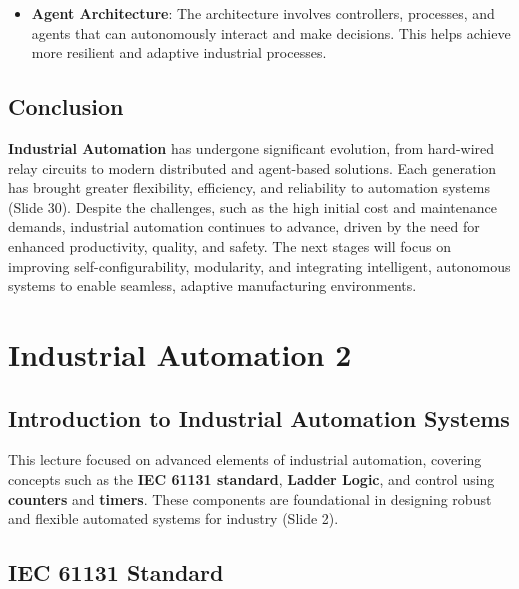 \documentclass[
  14pt,
  a4paper,
  numbers=noendperiod,
  headinclude=true,
  footinclude=true,
  DIV=calc]{scrreprt}
\providecommand{\tightlist}{%
  \setlength{\itemsep}{0pt}\setlength{\parskip}{0pt}}\usepackage{longtable,booktabs,array}
\begin{document}
\begin{itemize}
\tightlist
\item
  \textbf{Agent Architecture}: The architecture involves controllers,
  processes, and agents that can autonomously interact and make
  decisions. This helps achieve more resilient and adaptive industrial
  processes.
\end{itemize}

\section{Conclusion}\label{conclusion-8}

\textbf{Industrial Automation} has undergone significant evolution, from
hard-wired relay circuits to modern distributed and agent-based
solutions. Each generation has brought greater flexibility, efficiency,
and reliability to automation systems (Slide 30). Despite the
challenges, such as the high initial cost and maintenance demands,
industrial automation continues to advance, driven by the need for
enhanced productivity, quality, and safety. The next stages will focus
on improving self-configurability, modularity, and integrating
intelligent, autonomous systems to enable seamless, adaptive
manufacturing environments.

\chapter{Industrial Automation 2}\label{industrial-automation-2}

\section{Introduction to Industrial Automation
Systems}\label{introduction-to-industrial-automation-systems}

This lecture focused on advanced elements of industrial automation,
covering concepts such as the \textbf{IEC 61131 standard},
\textbf{Ladder Logic}, and control using \textbf{counters} and
\textbf{timers}. These components are foundational in designing robust
and flexible automated systems for industry (Slide 2).

\section{IEC 61131 Standard}\label{iec-61131-standard}
\end{document}
